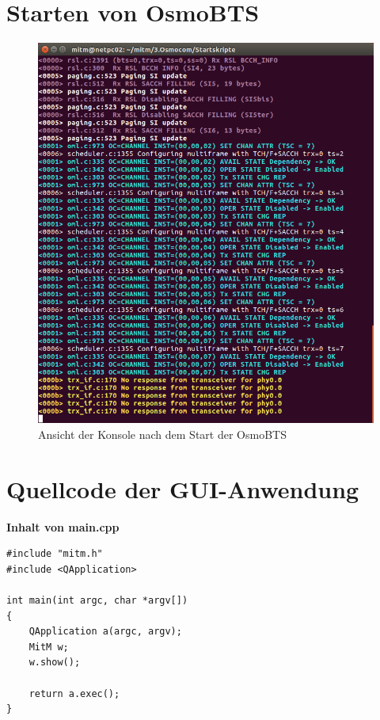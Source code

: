 \newpage
\section{Starten von OsmoBTS}\label{startOsmoBTS}
\begin{figure}[h] %
\centering
\includegraphics[width=15cm]{includes/Start_OsmoBTS}
\caption{Ansicht der Konsole nach dem Start der OsmoBTS}
\label{fig:OsmoBTS}
\end{figure}

\newpage
\section{Quellcode der GUI-Anwendung}\label{quellcodeGUI}

\textbf{Inhalt von main.cpp}

\begin{lstlisting}
#include "mitm.h"
#include <QApplication>

int main(int argc, char *argv[])
{
    QApplication a(argc, argv);
    MitM w;
    w.show();

    return a.exec();
}
\end{lstlisting}



